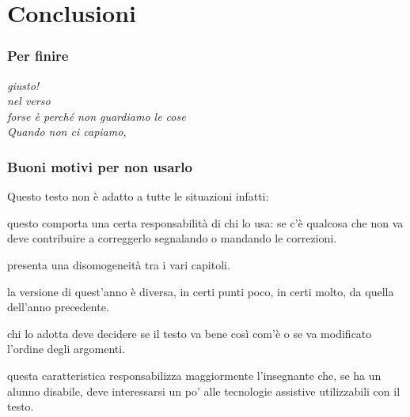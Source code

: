 \documentclass{beamer} %
\begin{document}
\section{Conclusioni}

\begin{frame}\frametitle{Per finire}

\begin{center}  \end{center}

\vspace{20mm}
\begin{flushright}
\emph{
giusto!\\
nel verso\\
forse è perché non guardiamo le cose\\
Quando non ci capiamo,}
\end{flushright}

\end{frame}


\begin{frame}\frametitle{Buoni motivi per non usarlo}

Questo testo non è adatto a tutte le situazioni infatti:
\pause
\begin{description} [<+->]
\item [È libero:~~~~ ] questo comporta una certa responsabilità di chi 
lo usa:
se c'è qualcosa che non va deve contribuire a correggerlo segnalando o 
mandando le correzioni.
\item [È collaborativo: ] presenta una disomogeneità tra i vari capitoli.
\item [È evolutivo: ] la versione di quest'anno è diversa, in certi punti 
poco, in certi molto, da quella dell'anno precedente.
\item [È polimorfo: ] chi lo adotta deve decidere se il testo va bene così 
com'è o se va modificato l'ordine degli argomenti.
\item [È accessibile: ] questa caratteristica responsabilizza maggiormente 
l'insegnante che, se ha un alunno disabile, deve interessarsi un po' alle 
tecnologie assistive utilizzabili con il testo.
\end{description}

\end{frame}
\end{document}
